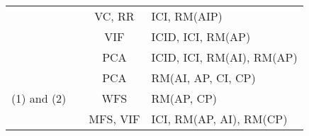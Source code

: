 \begin{table*}
{\begin{tabular}{c|c|c|l}
& \cite{Thongtanunam2016ICSEowndershipcodequality} & VC, RR & ICI, RM(AIP) \\
& \cite{YangTSE2015cohesion} & VIF & ICID, ICI, RM(AP) \\
& \cite{Zimmermann2008ICSEnetwork} & PCA & ICID, ICI, RM(AI), RM(AP) \\
\hline
& \cite{Ambros2010MSRExtensiveComparison} & PCA & RM(AI, AP, CI, CP) \\
(1) and (2) & \cite{DAmbros2012EMSEbenchmark} & WFS & RM(AP, CP) \\
& \cite{Palomba2017TSEsmell} & MFS, VIF & ICI, RM(AP, AI), RM(CP) \\ 
\hline
\end{tabular}
}
\end{table*}


